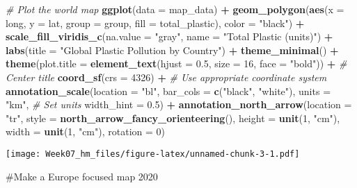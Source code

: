 \documentclass[
]{article}
\newenvironment{Shaded}{\begin{snugshade}}{\end{snugshade}}
\newcommand{\AttributeTok}[1]{\textcolor[rgb]{0.13,0.29,0.53}{#1}}
\newcommand{\CommentTok}[1]{\textcolor[rgb]{0.56,0.35,0.01}{\textit{#1}}}
\newcommand{\DecValTok}[1]{\textcolor[rgb]{0.00,0.00,0.81}{#1}}
\newcommand{\FloatTok}[1]{\textcolor[rgb]{0.00,0.00,0.81}{#1}}
\newcommand{\FunctionTok}[1]{\textcolor[rgb]{0.13,0.29,0.53}{\textbf{#1}}}
\newcommand{\NormalTok}[1]{#1}
\newcommand{\SpecialCharTok}[1]{\textcolor[rgb]{0.81,0.36,0.00}{\textbf{#1}}}
\newcommand{\StringTok}[1]{\textcolor[rgb]{0.31,0.60,0.02}{#1}}
\begin{document}
\begin{Shaded}
\begin{Highlighting}[]
\CommentTok{\# Plot the world map}
\FunctionTok{ggplot}\NormalTok{(}\AttributeTok{data =}\NormalTok{ map\_data) }\SpecialCharTok{+}
  \FunctionTok{geom\_polygon}\NormalTok{(}\FunctionTok{aes}\NormalTok{(}\AttributeTok{x =}\NormalTok{ long, }\AttributeTok{y =}\NormalTok{ lat, }\AttributeTok{group =}\NormalTok{ group, }\AttributeTok{fill =}\NormalTok{ total\_plastic), }\AttributeTok{color =} \StringTok{"black"}\NormalTok{) }\SpecialCharTok{+}
  \FunctionTok{scale\_fill\_viridis\_c}\NormalTok{(}\AttributeTok{na.value =} \StringTok{"gray"}\NormalTok{, }\AttributeTok{name =} \StringTok{"Total Plastic (units)"}\NormalTok{) }\SpecialCharTok{+}
  \FunctionTok{labs}\NormalTok{(}\AttributeTok{title =} \StringTok{"Global Plastic Pollution by Country"}\NormalTok{) }\SpecialCharTok{+}
  \FunctionTok{theme\_minimal}\NormalTok{() }\SpecialCharTok{+}
  \FunctionTok{theme}\NormalTok{(}\AttributeTok{plot.title =} \FunctionTok{element\_text}\NormalTok{(}\AttributeTok{hjust =} \FloatTok{0.5}\NormalTok{, }\AttributeTok{size =} \DecValTok{16}\NormalTok{, }\AttributeTok{face =} \StringTok{"bold"}\NormalTok{)) }\SpecialCharTok{+}  \CommentTok{\# Center title}
  \FunctionTok{coord\_sf}\NormalTok{(}\AttributeTok{crs =} \DecValTok{4326}\NormalTok{) }\SpecialCharTok{+}  \CommentTok{\# Use appropriate coordinate system}
  \FunctionTok{annotation\_scale}\NormalTok{(}\AttributeTok{location =} \StringTok{"bl"}\NormalTok{, }
                   \AttributeTok{bar\_cols =} \FunctionTok{c}\NormalTok{(}\StringTok{"black"}\NormalTok{, }\StringTok{"white"}\NormalTok{), }
                   \AttributeTok{units =} \StringTok{"km"}\NormalTok{,  }\CommentTok{\# Set units}
                   \AttributeTok{width\_hint =} \FloatTok{0.5}\NormalTok{) }\SpecialCharTok{+} 
  \FunctionTok{annotation\_north\_arrow}\NormalTok{(}\AttributeTok{location =} \StringTok{"tr"}\NormalTok{,}
                       \AttributeTok{style =} \FunctionTok{north\_arrow\_fancy\_orienteering}\NormalTok{(),}
                       \AttributeTok{height =} \FunctionTok{unit}\NormalTok{(}\DecValTok{1}\NormalTok{, }\StringTok{"cm"}\NormalTok{),}
                       \AttributeTok{width =} \FunctionTok{unit}\NormalTok{(}\DecValTok{1}\NormalTok{, }\StringTok{"cm"}\NormalTok{),}
                       \AttributeTok{rotation =} \DecValTok{0}\NormalTok{)  }
\end{Highlighting}
\end{Shaded}

\texttt{[image: Week07\_hm\_files/figure-latex/unnamed-chunk-3-1.pdf]}

\#Make a Europe focused map 2020
\end{document}
